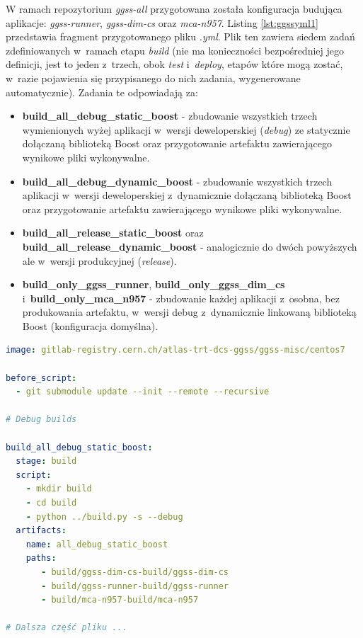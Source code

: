 W ramach repozytorium \textit{ggss-all} przygotowana została konfiguracja budująca aplikacje: \textit{ggss-runner}, \textit{ggss-dim-cs} oraz \textit{mca-n957}. Listing \ref{lst:ggssyml1} przedstawia fragment przygotowanego pliku \textit{.yml}. Plik ten zawiera siedem zadań zdefiniowanych w~ramach etapu \textit{build} (nie ma konieczności bezpośredniej jego definicji, jest to jeden z~trzech, obok \textit{test} i~\textit{deploy}, etapów które mogą zostać, w~razie pojawienia się przypisanego do nich zadania, wygenerowane automatycznie). Zadania te odpowiadają za:
\begin{itemize}
\item \textbf{build\_all\_debug\_static\_boost} - zbudowanie wszystkich trzech wymienionych wyżej aplikacji w~wersji deweloperskiej (\textit{debug}) ze statycznie dołączaną biblioteką Boost oraz przygotowanie artefaktu zawierającego wynikowe pliki wykonywalne.
\item \textbf{build\_all\_debug\_dynamic\_boost} - zbudowanie wszystkich trzech aplikacji w~wersji deweloperskiej z~dynamicznie dołączaną biblioteką Boost oraz przygotowanie artefaktu zawierającego wynikowe pliki wykonywalne.
\item \textbf{build\_all\_release\_static\_boost} oraz \textbf{build\_all\_release\_dynamic\_boost} - analogicznie do dwóch powyższych ale w~wersji produkcyjnej (\textit{release}).
\item \textbf{build\_only\_ggss\_runner}, \textbf{build\_only\_ggss\_dim\_cs} i~\textbf{build\_only\_mca\_n957} - zbudowanie każdej aplikacji z~osobna, bez produkowania artefaktu, w~wersji debug z~dynamicznie linkowaną biblioteką Boost (konfiguracja domyślna).
\end{itemize}

\begin{lstlisting}[language=yaml, caption={Fragment pliku \textit{.gitlab-ci.yml} konfigurującego \textit{pipeline} CI/CD dla repozytorium \textit{ggss-all}}, label={lst:ggssyml1}]
image: gitlab-registry.cern.ch/atlas-trt-dcs-ggss/ggss-misc/centos7

before_script:
  - git submodule update --init --remote --recursive

# Debug builds 

build_all_debug_static_boost:
  stage: build
  script:
    - mkdir build
    - cd build
    - python ../build.py -s --debug
  artifacts:
    name: all_debug_static_boost
    paths:
       - build/ggss-dim-cs-build/ggss-dim-cs
       - build/ggss-runner-build/ggss-runner
       - build/mca-n957-build/mca-n957

# Dalsza część pliku ...

\end{lstlisting}

